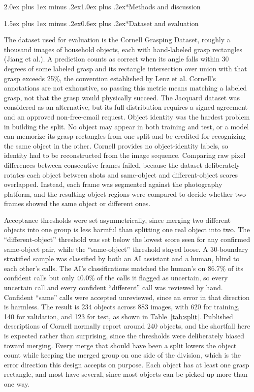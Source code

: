 \documentclass[12pt,letterpaper]{article}
\makeatletter
\renewcommand{\section}{\@startsection{section}{1}{0pt}%
  {2.0ex plus 1ex minus .2ex}{1.0ex plus .2ex}{\normalsize\bfseries}}
\renewcommand{\subsection}{\@startsection{subsection}{2}{0pt}%
  {1.5ex plus 1ex minus .2ex}{0.6ex plus .2ex}{\normalsize\itshape}}
\makeatother
\begin{document}
\section*{Methods and discussion}

\subsection*{Dataset and evaluation}

The dataset used for evaluation is the Cornell Grasping Dataset,
roughly a thousand images of household objects, each with hand-labeled
grasp rectangles (Jiang et al.). A prediction counts as correct when
its angle falls within 30 degrees of some labeled grasp and its
rectangle intersection over union with that grasp exceeds 25\%, the
convention established by Lenz et al. Cornell's annotations are not
exhaustive, so passing this metric means matching a labeled grasp, not
that the grasp would physically succeed. The Jacquard dataset was
considered as an alternative, but its full distribution requires a
signed agreement and an approved non-free-email request. Object
identity was the hardest problem in building the split. No object may
appear in both training and test, or a model can memorize its grasp
rectangles from one split and be credited for recognizing the same
object in the other. Cornell provides no object-identity labels, so
identity had to be reconstructed from the image sequence. Comparing raw
pixel differences between consecutive frames failed, because the
dataset deliberately rotates each object between shots and same-object
and different-object scores overlapped. Instead, each frame was
segmented against the photography platform, and the resulting object
regions were compared to decide whether two frames showed the same
object or different ones.

Acceptance thresholds were set asymmetrically, since merging two
different objects into one group is less harmful than splitting one
real object into two. The ``different-object'' threshold was set below
the lowest score seen for any confirmed same-object pair, while the
``same-object'' threshold stayed loose. A 30-boundary stratified sample
was classified by both an AI assistant and a human, blind to each
other's calls. The AI's classifications matched the human's on 86.7\%
of its confident calls but only 40.0\% of the calls it flagged as
uncertain, so every uncertain call and every confident ``different'' call
was reviewed by hand. Confident ``same'' calls were accepted unreviewed,
since an error in that direction is harmless. The result is 234 objects
across 883 images, with 620 for training, 140 for validation, and 123
for test, as shown in Table~\ref{tab:split}. Published descriptions of
Cornell normally report around 240 objects, and the shortfall here is
expected rather than surprising, since the thresholds were deliberately
biased toward merging. Every merge that should have been a split lowers
the object count while keeping the merged group on one side of the
division, which is the error direction this design accepts on purpose.
Each object has at least one grasp rectangle, and most have several,
since most objects can be picked up more than one way.
\end{document}
